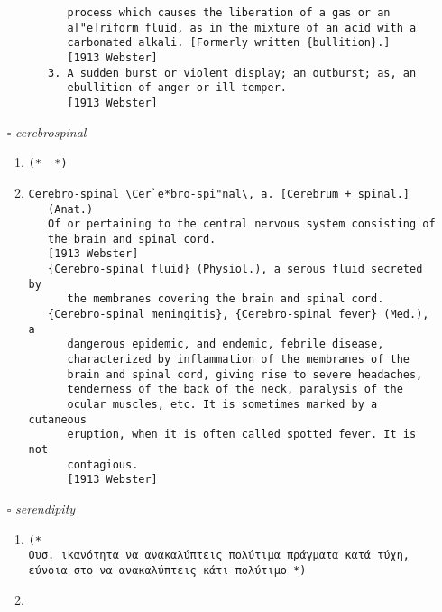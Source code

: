 \documentclass{article}
\begin{document}
\begin{itemize}
\begin{enumerate}
{\begin{lstlisting}
      process which causes the liberation of a gas or an
      a["e]riform fluid, as in the mixture of an acid with a
      carbonated alkali. [Formerly written {bullition}.]
      [1913 Webster]
   3. A sudden burst or violent display; an outburst; as, an
      ebullition of anger or ill temper.
      [1913 Webster]
\end{lstlisting}}
\end{enumerate}
\item[$\square$] \emph{ cerebrospinal }
\begin{enumerate}
\item{
\begin{lstlisting}
(*  *)
\end{lstlisting}}
\item{
\begin{lstlisting}
Cerebro-spinal \Cer`e*bro-spi"nal\, a. [Cerebrum + spinal.]
   (Anat.)
   Of or pertaining to the central nervous system consisting of
   the brain and spinal cord.
   [1913 Webster]
   {Cerebro-spinal fluid} (Physiol.), a serous fluid secreted by
      the membranes covering the brain and spinal cord.
   {Cerebro-spinal meningitis}, {Cerebro-spinal fever} (Med.), a
      dangerous epidemic, and endemic, febrile disease,
      characterized by inflammation of the membranes of the
      brain and spinal cord, giving rise to severe headaches,
      tenderness of the back of the neck, paralysis of the
      ocular muscles, etc. It is sometimes marked by a cutaneous
      eruption, when it is often called spotted fever. It is not
      contagious.
      [1913 Webster]
\end{lstlisting}}
\end{enumerate}
\item[$\square$] \emph{ serendipity }
\begin{enumerate}
\item{
\begin{lstlisting}
(* 
Ουσ. ικανότητα να ανακαλύπτεις πολύτιμα πράγματα κατά τύχη, εύνοια στο να ανακαλύπτεις κάτι πολύτιμο *)
\end{lstlisting}}
\item{
\begin{lstlisting}


\end{lstlisting}}
\end{enumerate}
\end{itemize}
\end{document}
